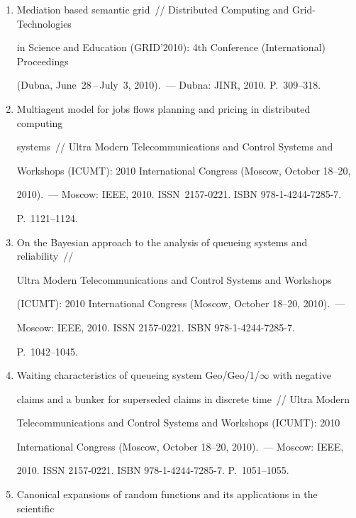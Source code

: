 \begin{enumerate}[1.]
\item {}


Mediation based semantic grid~/\!\!/  Distributed Computing and Grid-Technologies 


in Science and Education (GRID'2010): 4th  Conference (International) Proceedings


(Dubna, June~28\,--\,July~3, 2010).~--- Dubna: JINR, 2010. P.~309--318.


\item {}


Multiagent model for jobs flows planning and pricing in distributed computing 


systems~/\!\!/  Ultra Modern Telecommunications and Control Systems and 


Workshops (ICUMT): 2010 International Congress (Moscow, October 18--20,


2010).~--- Moscow: IEEE, 2010. ISSN~2157-0221. ISBN 978-1-4244-7285-7. 


P.~1121--1124.


\item {}


On the Bayesian approach to the analysis of queueing systems and reliability~/\!\!/  


Ultra Modern Telecommunications and Control Systems and Workshops 


(ICUMT): 2010 International Congress (Moscow, October 18--20, 2010).~--- 


Moscow: IEEE, 2010. ISSN 2157-0221. ISBN 978-1-4244-7285-7. 


P.~1042--1045.


\item {}


Waiting characteristics of queueing system Geo/Geo/1/$\infty$ with negative 


claims and a bunker for superseded claims in discrete time~/\!\!/  Ultra Modern 


Telecommunications and Control Systems and Workshops (ICUMT): 2010 


International Congress (Moscow, October 18--20, 2010).~--- Moscow: IEEE, 


2010. ISSN 2157-0221. ISBN 978-1-4244-7285-7. P.~1051--1055.


\item {}


Canonical expansions of random functions and its applications in the scientific 



\end{enumerate}
